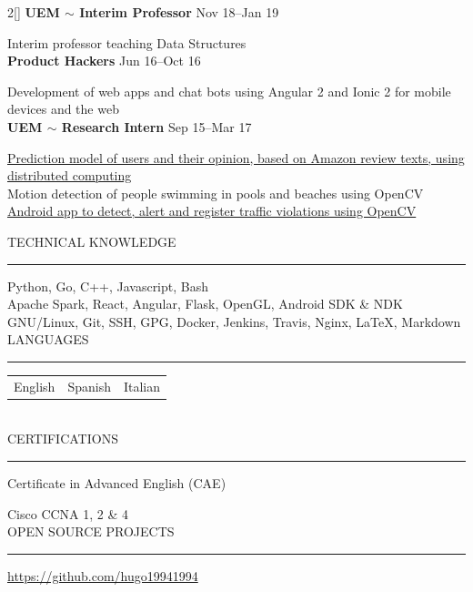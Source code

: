 \documentclass[a4paper, 12pt]{article}
\newenvironment{myparacol}[2][]{%
\begin{paracol}{#2}[#1]\setlength{\parindent}{0pt}}{%
\end{paracol}}
\begin{document}
\begin{sloppypar}
\begin{myparacol}{2}
    \textbf{UEM $\sim$ Interim Professor} \hfill Nov 18--Jan 19

    Interim professor teaching Data Structures\\

    \textbf{Product Hackers} \hfill Jun 16--Oct 16

    Development of web apps and chat bots using Angular 2 and Ionic 2 for mobile devices and the web\\

    \textbf{UEM $\sim$ Research Intern} \hfill Sep 15--Mar 17

    \href{https://www.researchgate.net/publication/314142014_Prediction_of_User_Opinion_for_Products_-_A_Bag-of-Words_and_Collaborative_Filtering_based_Approach}{Prediction model of users and their opinion, based on Amazon review texts, using distributed computing}\\

    Motion detection of people swimming in pools and beaches using OpenCV\\

    \href{https://github.com/hugo19941994/infrac-coche}{Android app to detect, alert and register traffic violations using OpenCV}

    \switchcolumn{}

    TECHNICAL KNOWLEDGE
    \vspace{1mm}
    \hrule
    \kern9pt

    Python, Go, C++, Javascript, Bash\\

    Apache Spark, React, Angular, Flask, OpenGL, Android SDK \& NDK\\

    GNU/Linux, Git, SSH, GPG, Docker, Jenkins, Travis, Nginx, \LaTeX, Markdown\\

    LANGUAGES
    \vspace{1mm}
    \hrule
    \kern9pt
    \noindent\begin{tabularx}{\columnwidth}{@{} X X X}
        English & Spanish & Italian
    \end{tabularx}
    \\

    CERTIFICATIONS
    \vspace{1mm}
    \hrule
    \kern9pt
    Certificate in Advanced English (CAE)

    Cisco CCNA 1, 2 \& 4
    \\

    \noindent OPEN SOURCE PROJECTS
    \vspace{1mm}
    \hrule
    \kern9pt
    \url{https://github.com/hugo19941994}
\end{myparacol}
\end{sloppypar}
\end{document}
